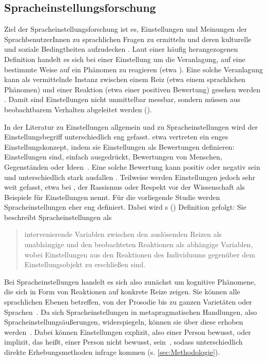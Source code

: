 \subsection{Spracheinstellungsforschung}
\label{sec:Spracheinstellungsforschung}
Ziel der Spracheinstellungsforschung ist es, \glqq Einstellungen und Meinungen der SprachbenutzerInnen zu sprachlichen Fragen zu ermitteln und deren kulturelle und soziale Bedingtheiten aufzudecken\grqq{} \citep[179]{Plewnia.2011}.
Laut einer häufig herangezogenen Definition handelt es sich bei einer Einstellung um die Veranlagung, auf eine bestimmte Weise auf ein Phänomen zu reagieren (etwa \cites[805]{Allport.1935}[69]{Hermanns.2002}[116]{Garrett.2007}[63]{Adler.2018}).
Eine solche Veranlagung kann als vermittelnde Instanz zwischen einem Reiz (etwa einem sprachlichen Phänomen) und einer Reaktion (etwa einer positiven Bewertung) gesehen werden \citep[s.][1319]{Vandermeeren2005}. 
Damit sind Einstellungen nicht unmittelbar messbar, sondern müssen aus beobachtbarem Verhalten abgeleitet werden (\cites[s.][242, 245]{Ajzen1989}[1319]{Vandermeeren2005}). 

In der Literatur zu Einstellungen allgemein und zu Spracheinstellungen wird der Einstellungsbegriff unterschiedlich eng gefasst.
\citet{Aronson.2014} etwa vertreten ein enges Einstellungskonzept, indem sie Einstellungen als Bewertungen definieren: {\glqq}Einstellungen sind, einfach ausgedr{\"u}ckt, Bewertungen von Menschen, Gegenst{\"a}nden oder Ideen{\grqq}~\citep[218]{Aronson.2014}. 
Eine solche Bewertung kann positiv oder negativ sein und unterschiedlich stark ausfallen \citep[s.][199]{Jonas.2014}. 
Teilweise werden Einstellungen jedoch sehr weit gefasst, etwa bei \citet[802]{Allport.1935}, der Rassismus oder Respekt vor der Wissenschaft als Beispiele f{\"u}r Einstellungen nennt. 
Für die vorliegende Studie werden Spracheinstellungen eher eng definiert. 
Dabei wird \citeauthor{Neuland.1993}s (\citeyear{Neuland.1993}) Definition gefolgt: Sie beschreibt Spracheinstellungen als
\begin{quote}intervenierende Variablen zwischen den ausl{\"o}senden Reizen als unabh{\"a}ngige und den beobachteten Reaktionen als abh{\"a}ngige Variablen, wobei Einstellungen aus den Reaktionen des Individuums gegen{\"u}ber dem Einstellungsobjekt zu erschlie{\ss}en sind.~\citep[728]{Neuland.1993}\end{quote}
Bei Spracheinstellungen handelt es sich also zunächst um kognitive Phänomene, die sich in Form von Reaktionen auf konkrete Reize zeigen. 
Sie k{\"o}nnen alle sprachlichen Ebenen betreffen, von der Prosodie bis zu ganzen Variet{\"a}ten oder Sprachen~\citep[s.][2]{Garrett.2012}. 
Da sich Spracheinstellungen in metapragmatischen Handlungen, %
also Spracheinstellungsäußerungen, %
widerspiegeln, können sie über diese erhoben werden~\citep[s.][1319]{Vandermeeren2005}. 
Dabei können Einstellungen explizit, also einer Person bewusst, oder implizit, das heißt, einer Person nicht bewusst, sein~\citep[s.][222]{Aronson.2014}, sodass unterschiedlich direkte Erhebungsmethoden infrage kommen (s. \autoref{sec:Methodologie}). 
